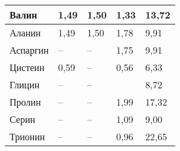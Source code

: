 \begin{longtable}{|X|Y|Y|Y|Y|}
     Валин &       1,49 &       1,50 &       1,33 &      13,72 \\ \hline
    Аланин &       1,49 &       1,50 &       1,78 &       9,91 \\ \hline
  Аспаргин &          --  &       --     &       1,75 &       9,91 \\ \hline
   Цистеин &       0,59 &        --    &       0,56 &       6,33 \\ \hline
    Глицин &        --    &       --     &            &       8,72 \\ \hline
    Пролин &        --    &       --     &       1,99 &      17,32 \\ \hline
     Серин &        --    &        --    &       1,09 &       9,00 \\ \hline
   Трионин &        --    &        --    &       0,96 &      22,65 \\ \hline
  \end{longtable}
